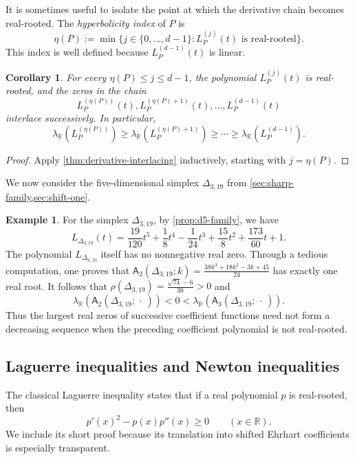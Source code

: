 \documentclass[reqno, 12pt]{article}
\numberwithin{equation}{section}
\newtheorem{corollary}[theorem]{Corollary}
\theoremstyle{definition}
\newtheorem{example}[theorem]{Example}
\newcommand{\R}{\mathbb{R}}
\newcommand{\A}{\mathsf{A}}
\begin{document}
It is sometimes useful to isolate the point at which the derivative chain
becomes real-rooted.
The \emph{hyperbolicity index} of $P$ is
\[\eta(P):=\min\{j\in\{0,\ldots,d-1\}:L_P^{(j)}(t)\text{ is real-rooted}\}.
\]
This index is well defined because $L_P^{(d-1)}(t)$ is linear.


\begin{corollary}\label{cor:interlacing-tail}
For every $\eta(P)\leq j\leq d-1$, the polynomial $L_P^{(j)}(t)$ is real-rooted,  and the zeros in the chain
\[L_P^{(\eta(P))}(t),L_P^{(\eta(P)+1)}(t),\ldots,L_P^{(d-1)}(t)
\]
interlace successively.  In particular,
\[\lambda_{\R}(L_P^{(\eta(P))})\geq\lambda_{\R}(L_P^{(\eta(P)+1)})\geq\cdots\geq\lambda_{\R}(L_P^{(d-1)}).
\]
\end{corollary}
\begin{proof}
Apply \cref{thm:derivative-interlacing} inductively, starting with $j=\eta(P)$.
\end{proof}


We now consider the five-dimensional simplex $\Delta_{3,19}$ from \cref{sec:sharp-family,sec:shift-one}.

\begin{example}\label{prop:q19-noninterlacing}
For the simplex $\Delta_{3,19}$, by \cref{prop:d5-family}, we have 
\[L_{\Delta_{3,19}}(t)=\frac{19}{120}t^5+\frac18t^4-\frac1{24}t^3+\frac{15}{8}t^2+\frac{173}{60}t+1.
\]
The polynomial $L_{\Delta_{3,19}}$ itself has no nonnegative real zero.
Through a tedious computation, one proves that $\A_2(\Delta_{3,19};k)=\frac{38k^3+18k^2-3k+45}{24}$ has exactly one real root.
It follows that $\rho(\Delta_{3,19})=\frac{\sqrt{74}-6}{38}>0$ and
\[\lambda_{\R}\!\left(\A_2(\Delta_{3,19};\,\cdot\,)\right)<0<\lambda_{\R}\!\left(\A_3(\Delta_{3,19};\,\cdot\,)\right).
\]
Thus the largest real zeros of successive coefficient functions need not form a decreasing sequence when the preceding coefficient polynomial is not real-rooted.
\end{example}


\subsection{Laguerre inequalities and Newton inequalities}

The classical Laguerre inequality states that if a real polynomial $p$ is real-rooted, then
\[p'(x)^2-p(x)p''(x)\geq0\qquad(x\in\R).
\]
We include its short proof because its translation into shifted Ehrhart coefficients is especially transparent.
\end{document}
